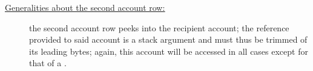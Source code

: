 \begin{description}
	\item[\underline{\underline{Generalities about the second account row:}}]
		the second account row peeks into the recipient account;
		the reference provided to said account is a stack argument and must thus be trimmed of its leading bytes;
		again, this account will be accessed in all cases except for that of a \staticxSH{}.


\end{description}
